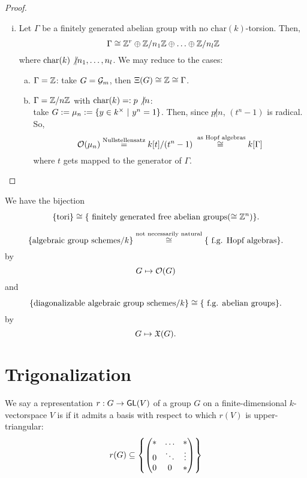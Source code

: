 \begin{proof}
\begin{enumerate}[(i)]
	\item Let $\Gamma$ be a finitely generated abelian group with no $\mathrm{char}(k)$-torsion. Then,
	\[\Gamma \overset{}{\cong} \mathbb{Z}^r \oplus \mathbb{Z}/n_1\mathbb{Z} \oplus \ldots \oplus \mathbb{Z}/n_l\mathbb{Z}\]
	where $\mathrm{char}(k) \not| n_1 , \ldots , n_l$. We may reduce to the cases:
	\begin{enumerate}[(a)]
		\item $\Gamma = \mathbb{Z}$: take $G = \mathcal{G}_m$, then $\Xi(G) \overset{}{\cong} \mathbb{Z} \overset{}{\cong} \Gamma$.
		\item $\Gamma = \mathbb{Z}/n\mathbb{Z}$ with $\mathrm{char}(k) =: p \not | n$:\\
		take $G:= \mu_n := \left\lbrace y \in k^\times ~ | ~ y^n = 1\right\rbrace$. Then, since $p\not| n$, $(t^n - 1)$ is radical.
		So, 
		\[ \mathcal{O}(\mu_n) \overset{\text{Nullstellensatz}}{=} k[t] /(t^n - 1) \overset{\text{ as Hopf algebras}}{\cong} k[\Gamma] \]
		where $t$ gets mapped to the generator of $\Gamma$.
	\end{enumerate}
 \end{enumerate}
\end{proof}
\begin{corollary}
We have the bijection
\[
\{\text{tori}\}
\overset{}{\cong}
\{ \text{ finitely generated free abelian groups} (\overset{}{\cong} \mathbb{Z}^n) \}.
\]
\end{corollary}

\begin{remark}
\[
\{\text{algebraic group schemes} / k\}
\overset{\text{not necessarily natural}}{\cong}
\{ \text{ f.g. Hopf algebras} \}.
\]
by
\[ G \mapsto \mathcal{O}(G) \]
and
\[
\{\text{diagonalizable algebraic group schemes}/k\}
\overset{}{\cong}
\{ \text{ f.g. abelian groups} \}.
	\]
by
\[ G \mapsto \mathfrak{X}(G). \]
\end{remark}

\newpage
\section{Trigonalization}
We say a representation $r : G \overset{}{\rightarrow} \textsf{GL}(V)$ of a group $G$ on a finite-dimensional $k$-vectorspace $V$ is  if it admits a basis with respect to which $r(V)$ is upper-triangular:
\[ r(G) \subseteq \left\lbrace
\left(\begin{matrix} * & \ldots & *\\ 0 & \ddots & \vdots \\ 0 & 0 & * \end{matrix}\right)
\right\rbrace \]

